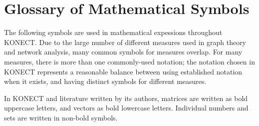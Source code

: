 \documentclass{article}
\begin{document}
\section{Glossary of Mathematical Symbols}
The following symbols are used in mathematical expessions throughout
KONECT.  Due to the large number of different measures used in graph
theory and network analysis, many common symbols for measures overlap.
For many measures, there is more than one commonly-used notation; the
notation chosen in KONECT represents a reasonable balance between using established
notation when it exists, and having distinct symbols for different
measures. 

In KONECT and literature written by its authors, matrices are written as
bold uppercase letters, and vectors as bold lowercase letters.
Individual numbers and sets are written in non-bold symbols.  \\
\end{document}
